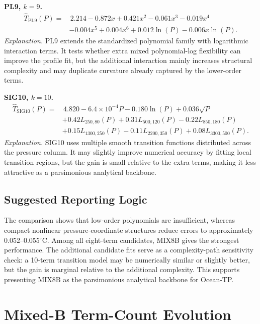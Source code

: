 \documentclass[10pt]{article}
\begin{document}
\vspace{0.35em}
\noindent\textbf{PL9, $k=9$.}
\[
\begin{aligned}
\hat{T}_{\mathrm{PL9}}(P)=&\,2.214
-0.872x
+0.421x^2
-0.061x^3
-0.019x^4 \\
&-0.004x^5
+0.004x^6
+0.012\ln(P)
-0.006x\ln(P).
\end{aligned}
\]
\noindent\emph{Explanation.}
PL9 extends the standardized polynomial family with logarithmic interaction terms. It tests whether extra mixed polynomial-log flexibility can improve the profile fit, but the additional interaction mainly increases structural complexity and may duplicate curvature already captured by the lower-order terms.

\vspace{0.35em}
\noindent\textbf{SIG10, $k=10$.}
\[
\begin{aligned}
\hat{T}_{\mathrm{SIG10}}(P)=&\,4.820
-6.4\times10^{-4}P
-0.180\ln(P)
+0.036\sqrt{P} \\
&+0.42L_{250,80}(P)
+0.31L_{500,120}(P)
-0.22L_{850,180}(P) \\
&+0.15L_{1300,250}(P)
-0.11L_{2200,350}(P)
+0.08L_{3300,500}(P).
\end{aligned}
\]
\noindent\emph{Explanation.}
SIG10 uses multiple smooth transition functions distributed across the pressure column. It may slightly improve numerical accuracy by fitting local transition regions, but the gain is small relative to the extra terms, making it less attractive as a parsimonious analytical backbone.

\subsection{Suggested Reporting Logic}

\noindent
The comparison shows that low-order polynomials are insufficient, whereas compact nonlinear pressure-coordinate structures reduce errors to approximately 0.052--0.055$^\circ$C.
Among all eight-term candidates, MIX8B gives the strongest performance.
The additional candidate fits serve as a complexity-path sensitivity check: a 10-term transition model may be numerically similar or slightly better, but the gain is marginal relative to the additional complexity.
This supports presenting MIX8B as the parsimonious analytical backbone for Ocean-TP.

\clearpage
\section{Mixed-B Term-Count Evolution}
\label{sec:mixb-term-count-evolution}
\end{document}
